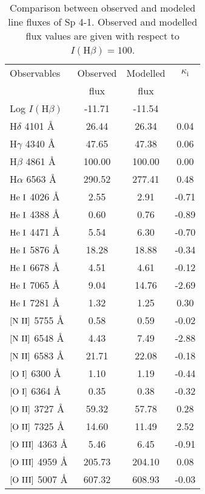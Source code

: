 \documentclass[a4paper,fleqn,usenatbib]{mnras}
\begin{document}
\begin{table}
\centering
\small
\caption{Comparison between observed and modeled line fluxes of Sp 4-1. Observed and modelled flux values are given with respect to $I(\mathrm{H}\beta)=100$. \label{tab:obsvsmodsp4-1}}
\begin{tabular}{lccc}
\hline
Observables & Observed & Modelled & $\kappa_\mathrm{i}$\\
& flux & flux &\\
\hline
Log $I(\mathrm{H}\beta)$ & -11.71 & -11.54 & \\
	H$\delta$			4101	{\AA}	&	26.44	&	26.34	&	0.04	\\
	H$\gamma$			4340	{\AA}	&	47.65	&	47.38	&	0.06	\\
	H$\beta$			4861	{\AA}	&	100.00	&	100.00	&	0.00	\\
	H$\alpha$			6563	{\AA}	&	290.52	&	277.41	&	0.48	\\
$\mathrm{	He~{\sc	I}	}$	4026	{\AA}	&	2.55	&	2.91	&	-0.71	\\
$\mathrm{	He~{\sc	I}	}$	4388	{\AA}	&	0.60	&	0.76	&	-0.89	\\
$\mathrm{	He~{\sc	I}	}$	4471	{\AA}	&	5.54	&	6.30	&	-0.70	\\
$\mathrm{	He~{\sc	I}	}$	5876	{\AA}	&	18.28	&	18.88	&	-0.34	\\
$\mathrm{	He~{\sc	I}	}$	6678	{\AA}	&	4.51	&	4.61	&	-0.12	\\
$\mathrm{	He~{\sc	I}	}$	7065	{\AA}	&	9.04	&	14.76	&	-2.69	\\
$\mathrm{	He~{\sc	I}	}$	7281	{\AA}	&	1.32	&	1.25	&	0.30	\\
$\mathrm{	[N~{\sc	II}]	}$	5755	{\AA}	&	0.58	&	0.59	&	-0.02	\\
$\mathrm{	[N~{\sc	II}]	}$	6548	{\AA}	&	4.43	&	7.49	&	-2.88	\\
$\mathrm{	[N~{\sc	II}]	}$	6583	{\AA}	&	21.71	&	22.08	&	-0.18	\\
$\mathrm{	[O~{\sc	I}]	}$	6300	{\AA}	&	1.10	&	1.19	&	-0.44	\\
$\mathrm{	[O~{\sc	I}]	}$	6364	{\AA}	&	0.35	&	0.38	&	-0.32	\\
$\mathrm{	[O~{\sc	II}]	}$	3727	{\AA}	&	59.32	&	57.78	&	0.28	\\
$\mathrm{	[O~{\sc	II}]	}$	7325	{\AA}	&	14.60	&	11.49	&	2.52	\\
$\mathrm{	[O~{\sc	III}]	}$	4363	{\AA}	&	5.46	&	6.45	&	-0.91	\\
$\mathrm{	[O~{\sc	III}]	}$	4959	{\AA}	&	205.73	&	204.10	&	0.08	\\
$\mathrm{	[O~{\sc	III}]	}$	5007	{\AA}	&	607.32	&	608.93	&	-0.03	\\

\end{tabular}
\end{table}
\end{document}
